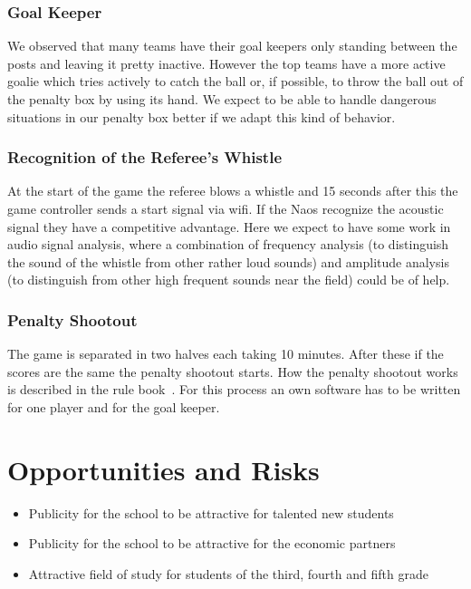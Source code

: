 \documentclass[12pt]{article}
\theoremstyle{definition}
\begin{document}
\subsubsection{Goal Keeper}
We observed that many teams have their goal keepers only standing between the posts and leaving it pretty inactive. However the top teams have a more active goalie which tries actively to catch the ball or, if possible, to throw the ball out of the penalty box by using its hand. We expect to be able to handle dangerous situations in our penalty box better if we adapt this kind of behavior.

\subsubsection{Recognition of the Referee's Whistle}
At the start of the game the referee blows a whistle and 15 seconds after this the game controller sends a start signal via wifi. If the Naos recognize the acoustic signal they have a competitive advantage. Here we expect to have some work in audio signal analysis, where a combination of frequency analysis (to distinguish the sound of the whistle from other rather loud sounds) and amplitude analysis (to distinguish from other high frequent sounds near the field) could be of help.

\subsubsection{Penalty Shootout}
The game is separated in two halves each taking 10 minutes. After these if the scores are the same the penalty shootout starts. How the penalty shootout works is described in the rule book~\cite{robocup_technical_committee_robocup_2016}. For this process an own software has to be written for one player and for the goal keeper. 


\section{Opportunities and Risks}
\begin{itemize}
\item Publicity for the school to be attractive for talented new students
\item Publicity for the school to be attractive for the economic partners
\item Attractive field of study for students of the third, fourth and fifth grade
\end{itemize}
\end{document}
